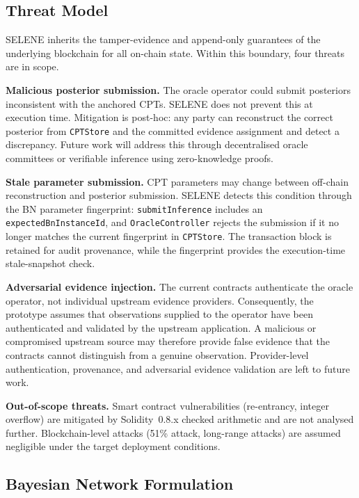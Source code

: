 \documentclass[journal]{IEEEtran}
\theoremstyle{definition}
\theoremstyle{remark}
\begin{document}
\subsection{Threat Model}

SELENE inherits the tamper-evidence and append-only
guarantees of the underlying blockchain for all
on-chain state. Within this boundary, four threats
are in scope.

\textbf{Malicious posterior submission.}
The oracle operator could submit posteriors inconsistent
with the anchored CPTs. SELENE does not prevent this at
execution time. Mitigation is post-hoc: any party can
reconstruct the correct posterior from \texttt{CPTStore}
and the committed evidence assignment and detect a
discrepancy. Future work will address this through
decentralised oracle committees or verifiable inference
using zero-knowledge proofs.

\textbf{Stale parameter submission.}
CPT parameters may change between off-chain reconstruction
and posterior submission. SELENE detects this condition
through the BN parameter fingerprint:
\texttt{submitInference} includes an
\texttt{expectedBnInstanceId}, and
\texttt{OracleController} rejects the submission if it no
longer matches the current fingerprint in
\texttt{CPTStore}. The transaction block is retained for
audit provenance, while the fingerprint provides the
execution-time stale-snapshot check.

\textbf{Adversarial evidence injection.}
The current contracts authenticate the oracle operator,
not individual upstream evidence providers. Consequently,
the prototype assumes that observations supplied to the
operator have been authenticated and validated by the
upstream application. A malicious or compromised upstream
source may therefore provide false evidence that the
contracts cannot distinguish from a genuine observation.
Provider-level authentication, provenance, and adversarial
evidence validation are left to future work.

\textbf{Out-of-scope threats.}
Smart contract vulnerabilities (re-entrancy, integer
overflow) are mitigated by Solidity~0.8.x checked
arithmetic and are not analysed further.
Blockchain-level attacks (51\% attack, long-range
attacks) are assumed negligible under the target
deployment conditions.

\subsection{Bayesian Network Formulation}
\end{document}
